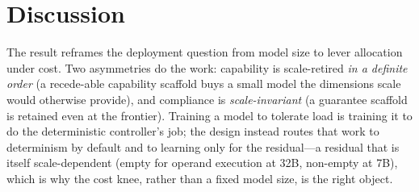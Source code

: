 \section{Discussion}\label{sec:discussion}
The result reframes the deployment question from model size to lever allocation under cost. Two asymmetries do the work: capability is scale-retired \emph{in a definite order} (a recede-able capability scaffold buys a small model the dimensions scale would otherwise provide), and compliance is \emph{scale-invariant} (a guarantee scaffold is retained even at the frontier). Training a model to tolerate load is training it to do the deterministic controller's job; the design instead routes that work to determinism by default and to learning only for the residual---a residual that is itself scale-dependent (empty for operand execution at 32B, non-empty at 7B), which is why the cost knee, rather than a fixed model size, is the right object.
